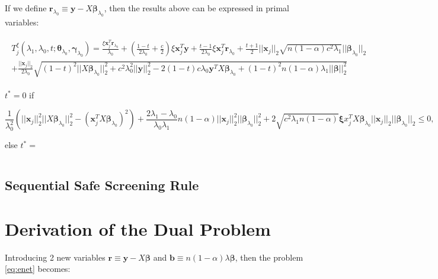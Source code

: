 If we define $\boldsymbol r_{\lambda_0}\equiv \boldsymbol y-X\boldsymbol\beta_{\lambda_0}$, then the results above can be expressed in primal variables:

\begin{gather}
    \begin{aligned}
        T^\xi_j(\lambda_1,\lambda_0,t;\boldsymbol\theta_{\lambda_0},\boldsymbol\gamma_{\lambda_0})= \frac{\xi \boldsymbol x_j^T \boldsymbol r_{\lambda_0}}{\lambda_0}+ \left(\frac{1-t}{2\lambda_0}+\frac{c}{2}\right)\xi\boldsymbol x_j^T \boldsymbol y+\frac{t-1}{2\lambda_0}\xi \boldsymbol x_j^T \boldsymbol r_{\lambda_0}+\frac{t+1}{2}||\boldsymbol x_j||_2\sqrt{n(1-\alpha) c^2\lambda_1}||\boldsymbol\beta_{\lambda_0}||_2\\
        +\frac{||\boldsymbol x_j||_2}{2\lambda_0}\sqrt{(1-t)^2||X\boldsymbol\beta_{\lambda_0}||_2^2+c^2\lambda_0^2||\boldsymbol y||_2^2-2(1-t)c\lambda_0 \boldsymbol y^TX\boldsymbol\beta_{\lambda_0}+(1-t)^2n(1-\alpha)\lambda_1||\boldsymbol\beta||_2^2}
    \end{aligned}
\end{gather}

$t^*=0$ if

\begin{equation}
    \frac{1}{\lambda_0^2}\left(||\boldsymbol x_j||_2^2||X\boldsymbol\beta_{\lambda_0}||_2^2-(\boldsymbol x_j^TX\boldsymbol\beta_{\lambda_0})^2\right)+\frac{2\lambda_1-\lambda_0}{\lambda_0\lambda_1}n(1-\alpha)||\boldsymbol x_j||_2^2||\boldsymbol\beta_{\lambda_0}||_2^2+2\sqrt{c^2\lambda_1n(1-\alpha)}\boldsymbol \xi x_j^TX\boldsymbol\beta_{\lambda_0}||\boldsymbol x_j||_2||\boldsymbol\beta_{\lambda_0}||_2\leq 0,
\end{equation}

else $t^*=$

\begin{equation}
    
\end{equation}

\subsection{Sequential Safe Screening Rule}


\appendix
\appendixpage


\section{Derivation of the Dual Problem}


Introducing 2 new variables $\boldsymbol r\equiv \boldsymbol y-X\boldsymbol\beta$ and $\boldsymbol b\equiv n(1-\alpha)\lambda \boldsymbol\beta$, then the problem \eqref{eq:enet} becomes:

